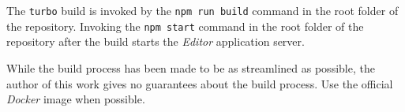 The \texttt{turbo} build is invoked by the \texttt{npm run build} command in the root folder of the repository.
Invoking the \texttt{npm start} command in the root folder of the repository after the build starts the \textit{Editor} application server.

While the build process has been made to be as streamlined as possible, the author of this work gives no guarantees about the build process.
Use the official \textit{Docker} image when possible.
